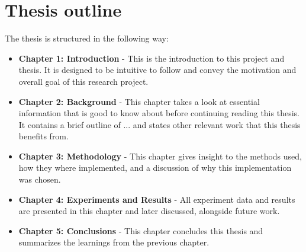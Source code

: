\label{sec:1_7_thesis_outline}

\begin{comment}
Describe how you have divided your thesis into chapters, and briefly list what the reader will find in each chapter.
\end{comment}

\section{Thesis outline}

The thesis is structured in the following way:

\begin{itemize}
    \item \textbf{Chapter 1: Introduction} - This is the introduction to this project and thesis. It is designed to be intuitive to follow and convey the motivation and overall goal of this research project.
    \item \textbf{Chapter 2: Background} - This chapter takes a look at essential information that is good to know about before continuing reading this thesis. It contains a brief outline of ... and states other relevant work that this thesis benefits from. 
    \item \textbf{Chapter 3: Methodology} - This chapter gives insight to the methods used, how they where implemented, and a discussion of why this implementation was chosen. 
    \item \textbf{Chapter 4: Experiments and Results} - All experiment data and results are presented in this chapter and later discussed, alongside future work. 
    \item \textbf{Chapter 5: Conclusions} - This chapter concludes this thesis and summarizes the learnings from the previous chapter. 
\end{itemize}